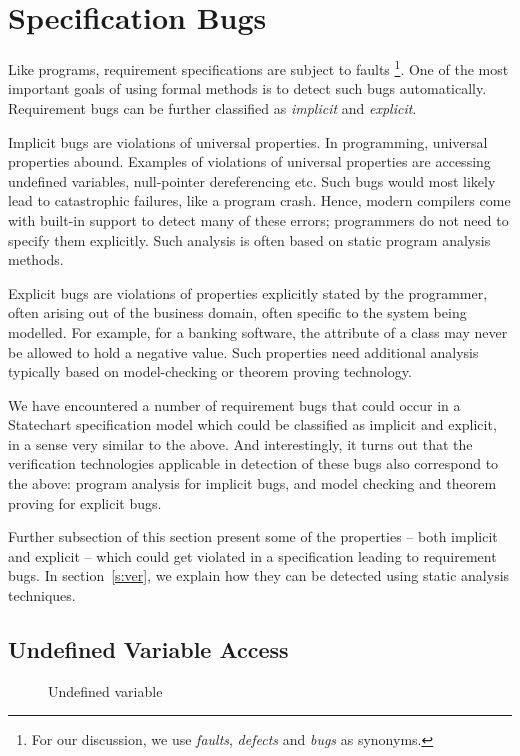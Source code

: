 \documentclass[12pt,a4paper]{article}
\begin{document}
\section{Specification Bugs} \label{s:sb}
Like programs, requirement specifications are subject to faults \footnote{For our discussion, we use \emph{faults}, \emph{defects} and \emph{bugs} as synonyms.}. One of the most important goals of using formal methods is to detect such bugs automatically. Requirement bugs can be further classified as \emph{implicit} and \emph{explicit}.

Implicit bugs are violations of universal properties. In programming, universal properties abound. Examples of violations of universal properties are accessing undefined variables, null-pointer dereferencing etc. Such bugs would most likely lead to catastrophic failures, like a program crash. Hence, modern compilers come with built-in support to detect many of these errors; programmers do not need to specify them explicitly. Such analysis is often based on static program analysis methods.

Explicit bugs are violations of properties explicitly stated by the programmer, often arising out of the business domain, often specific to the system being modelled. For example, for a banking software, the \lstinline@balance@ attribute of a \lstinline@BankAccount@ class may never be allowed to hold a negative value. Such properties need additional analysis typically based on model-checking or theorem proving technology. 

We have encountered a number of requirement bugs that could occur in a Statechart specification model which could be classified as implicit and explicit, in a sense very similar to the above. And interestingly, it turns out that the verification technologies applicable in detection of these bugs also correspond to the above: program analysis for implicit bugs, and model checking and theorem proving for explicit bugs.

Further subsection of this section present some of the properties -- both implicit and explicit -- which could get violated in a specification leading to requirement bugs.  In section~\ref{s:ver}, we explain how they can be detected using static analysis techniques.

\subsection{Undefined Variable Access}
\begin{figure}
\caption{Undefined variable}
\label{f:undefined}
\end{figure}
\end{document}
